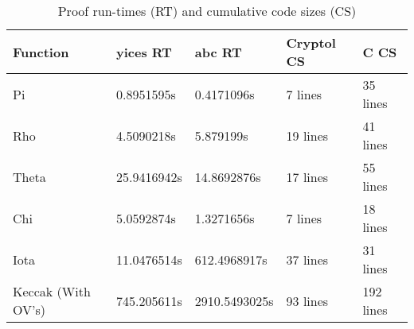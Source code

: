 \begin{table}[t]
  \caption{Proof run-times (RT) and cumulative code sizes (CS)}\label{statsTable}
  \setlength{\tabcolsep}{6.5pt}
  \begin{tabular}{|l|l|l|l|l|}
  \hline
  \textbf{Function} & \textbf{yices RT} & \textbf{abc RT} & \textbf{Cryptol CS} & \textbf{C CS} \\
  \hline
  Pi & 	0.8951595s & 0.4171096s & 7 lines & 35 lines \\
  Rho & 4.5090218s & 5.879199s & 19 lines & 41 lines \\
  Theta & 25.9416942s & 14.8692876s & 17 lines & 55 lines \\
  Chi & 5.0592874s & 1.3271656s & 7 lines & 18 lines \\
  Iota & 11.0476514s & 612.4968917s & 37 lines & 31 lines \\
  Keccak (With OV's) & 745.205611s &	2910.5493025s & 93 lines & 192 lines \\
  \hline
  \end{tabular}
  \end{table}